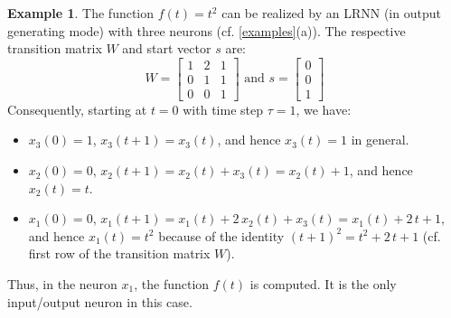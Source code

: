 \documentclass{sn-jnl}
\theoremstyle{definition}
\newtheorem{exmp}{Example}
\begin{document}
\begin{exmp}\label{parabola}
The function $f(t) = t^2$ can be realized by an LRNN (in output generating mode)
with three neurons (cf. \cref{examples}(a)). The respective transition matrix
$W$ and start vector $s$ are:
\[ W = \left[ \begin{array}{ccc}
	1 & 2 & 1\\
	0 & 1 & 1\\
	0 & 0 & 1
   \end{array} \right]
   \text{~and~} s = \left[ \begin{array}{c}
	0\\
	0\\
	1
   \end{array} \right]
\]
Consequently, starting at $t=0$ with time step $\tau=1$, we have:
\begin{itemize}
  \item $x_3(0) = 1$, $x_3(t+1) = x_3(t)$, and hence $x_3(t)=1$ in general.
  \item $x_2(0) = 0$, $x_2(t+1) = x_2(t)+x_3(t) = x_2(t)+1$, and hence $x_2(t)=t$.
  \item $x_1(0) = 0$, $x_1(t+1) = x_1(t)+ 2\,x_2(t) + x_3(t) = x_1(t)+ 2\,t +
	1$, and hence $x_1(t) = t^2$ because of the identity $(t+1)^2 = t^2 +
	2\,t + 1$ (cf. first row of the transition matrix $W$).
\end{itemize}
Thus, in the neuron $x_1$, the function $f(t)$ is computed. It is the only
input/output neuron in this case.
\end{exmp}
\end{document}
